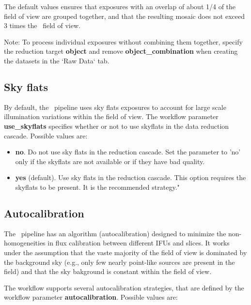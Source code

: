 The default values ensures that exposures with an overlap of about 1/4
of the field of view are grouped together, and that the resulting
mosaic does not exceed 3 times the \instname\ field of view.

Note: To process individual exposures without combining them together,
specify the reduction target {\bf object} and remove {\bf
  object\_combination} when creating the datasets in the `Raw Data`
tab.

\subsection{Sky flats}

By default, the \instname\ pipeline uses sky flats exposures to
account for large scale illumination variations within the field of
view.  The workflow parameter {\bf use\_skyflats} specifies whether or
not to use skyflats in the data reduction cascade. Possible values
are:

\begin{itemize}
\item {\bf no}. Do not use sky flats in the reduction cascade. Set the
  parameter to 'no' only if the skyflats are not available or if they
  have bad quality.

  \item {\bf yes} (default). Use sky flats in the reduction
    cascade. This option requires the skyflats to be present. It is
    the recommended strategy."
\end{itemize}

\subsection{Autocalibration}
\label{sec:configuration_autocalibration}

The \instname\ pipeline has an algorithm (autocalibration) designed to
minimize the non-homogeneities in flux calibration between different
IFUs and slices. It works under the assumption that the vaste majority
of the field of view is dominated by the background sky (e.g., only
few nearly point-like sources are present in the field) and that the
sky bakground is constant within the field of view.

The workflow supports several autocalibration strategies, that are
defined by the workflow parameter {\bf autocalibration}.  Possible
values are:

